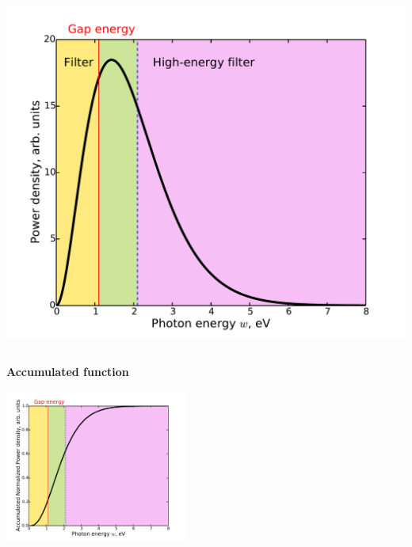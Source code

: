 \documentclass{beamer}
\begin{document}
\begin{frame}
\begin{columns}
\begin{column}{0.45\textwidth}
\begin{center}
  \includegraphics[width=1.0\textwidth]{figures/solar_spectrum/Planck-spectrum2.pdf} 

 \end{center}
\end{column}

\end{columns}

\vspace{-0.3cm}

 \begin{center}
 \textbf{Accumulated function}
 
\includegraphics[width=0.45\textwidth]{figures/solar_spectrum/Accumulated_power.pdf}
 \end{center}
 
\end{frame}
\end{document}
